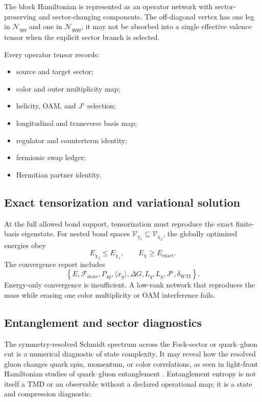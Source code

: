 \documentclass[11pt]{article}
\newcommand{\cV}{\mathcal V}
\newcommand{\cN}{\mathcal N}
\newcommand{\Jz}{J^z}
\newcommand{\WTI}{\mathrm{WTI}}
\begin{document}
The block Hamiltonian is represented as an operator network with sector-
preserving and sector-changing components.  The off-diagonal vertex has one
leg in \(\cN_{qqq}\) and one in \(\cN_{qqqg}\); it may not be absorbed into a
single effective valence tensor when the explicit sector branch is selected.

Every operator tensor records:
\begin{itemize}
 \item source and target sector;
 \item color and outer multiplicity map;
 \item helicity, OAM, and \(\Jz\) selection;
 \item longitudinal and transverse basis map;
 \item regulator and counterterm identity;
 \item fermionic swap ledger;
 \item Hermitian partner identity.
\end{itemize}

\subsection{Exact tensorization and variational solution}

At the full allowed bond support, tensorization must reproduce the exact
finite-basis eigenstate.  For nested bond spaces \(\cV_{\chi_1}\subseteq
\cV_{\chi_2}\), the globally optimized energies obey
\begin{equation}
 E_{\chi_2}\leq E_{\chi_1},
 \qquad
 E_\chi\geq E_{\mathrm{exact}}.
\end{equation}
The convergence report includes
\begin{equation}
 \left
 \{
 E,
 \mathcal F_{\mathrm{state}},
 P_{4g},
 \langle x_g\rangle,
 \Delta G,
 L_q,
 L_g,
 J^\mu,
 \delta_{\WTI}
 \right\}.
 \label{eq:tn-observables}
\end{equation}
Energy-only convergence is insufficient.  A low-rank network that reproduces
the mass while erasing one color multiplicity or OAM interference fails.

\subsection{Entanglement and sector diagnostics}

The symmetry-resolved Schmidt spectrum across the Fock-sector or quark--gluon
cut is a numerical diagnostic of state complexity.  It may reveal how the
resolved gluon changes quark spin, momentum, or color correlations, as seen in
light-front Hamiltonian studies of quark--gluon entanglement
\cite{Qian2024}.  Entanglement entropy is not itself a TMD or an observable
without a declared operational map; it is a state and compression diagnostic.
\end{document}

